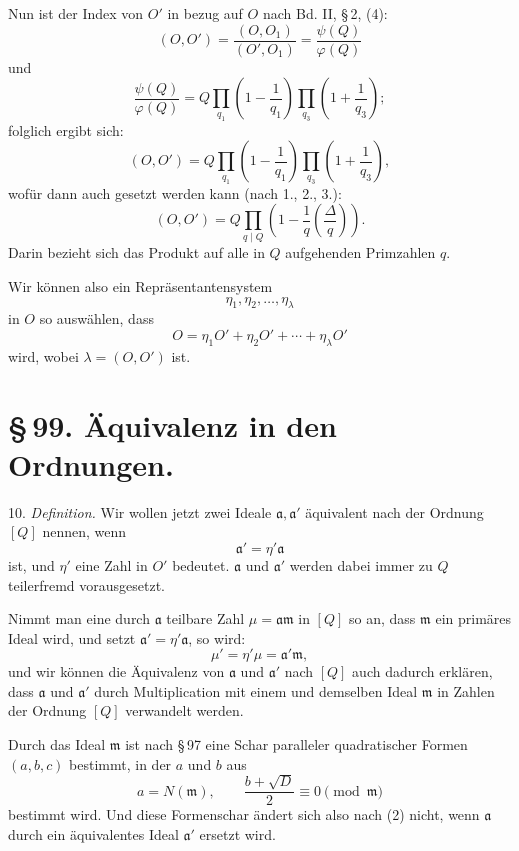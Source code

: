 \documentclass[11pt]{article}
\newcommand{\Jac}[2]{\left(\frac{#1}{#2}\right)}
\begin{document}
Nun ist der Index von $O'$ in bezug auf $O$ nach Bd. II, \S\,2, (4):
\[
 (O,O')=\frac{(O,O_1)}{(O',O_1)}=\frac{\psi(Q)}{\varphi(Q)}
\]
und
\[
 \frac{\psi(Q)}{\varphi(Q)}
 =Q\prod_{q_1}\left(1-\frac1{q_1}\right)
    \prod_{q_3}\left(1+\frac1{q_3}\right);
\]
folglich ergibt sich:
\[
 (O,O')
 =Q\prod_{q_1}\left(1-\frac1{q_1}\right)
    \prod_{q_3}\left(1+\frac1{q_3}\right),
\]
wofür dann auch gesetzt werden kann (nach 1., 2., 3.):
\begin{equation}
 (O,O')=
 Q\prod_{q\mid Q}\left(1-\frac1q\Jac{\Delta}{q}\right).
\tag{10}
\end{equation}
Darin bezieht sich das Produkt auf alle in $Q$ aufgehenden Primzahlen $q$.

Wir können also ein Repräsentantensystem
\[
 \eta_1,\eta_2,\ldots,\eta_\lambda
\]
in $O$ so auswählen, dass
\begin{equation}
 O=\eta_1O'+\eta_2O'+\cdots+\eta_\lambda O'
\tag{11}
\end{equation}
wird, wobei $\lambda=(O,O')$ ist.

\section*{\S\,99. Äquivalenz in den Ordnungen.}

10. \emph{Definition.} Wir wollen jetzt zwei Ideale $\mathfrak a,\mathfrak a'$ äquivalent nach der Ordnung $[Q]$ nennen, wenn
\begin{equation}
 \mathfrak a'=\eta'\mathfrak a
\tag{1}
\end{equation}
ist, und $\eta'$ eine Zahl in $O'$ bedeutet. $\mathfrak a$ und $\mathfrak a'$ werden dabei immer zu $Q$ teilerfremd vorausgesetzt.

Nimmt man eine durch $\mathfrak a$ teilbare Zahl $\mu=\mathfrak a\mathfrak m$ in $[Q]$ so an, dass $\mathfrak m$ ein primäres Ideal wird, und setzt $\mathfrak a'=\eta'\mathfrak a$, so wird:
\begin{equation}
 \mu'=\eta'\mu=\mathfrak a'\mathfrak m,
\tag{2}
\end{equation}
und wir können die Äquivalenz von $\mathfrak a$ und $\mathfrak a'$ nach $[Q]$ auch dadurch erklären, dass $\mathfrak a$ und $\mathfrak a'$ durch Multiplication mit einem und demselben Ideal $\mathfrak m$ in Zahlen der Ordnung $[Q]$ verwandelt werden.

Durch das Ideal $\mathfrak m$ ist nach \S\,97 eine Schar paralleler quadratischer Formen $(a,b,c)$ bestimmt, in der $a$ und $b$ aus
\begin{equation}
 a=N(\mathfrak m),\qquad
 \frac{b+\sqrt D}{2}\equiv0\pmod{\mathfrak m}
\tag{3}
\end{equation}
bestimmt wird. Und diese Formenschar ändert sich also nach (2) nicht, wenn $\mathfrak a$ durch ein äquivalentes Ideal $\mathfrak a'$ ersetzt wird.
\end{document}
